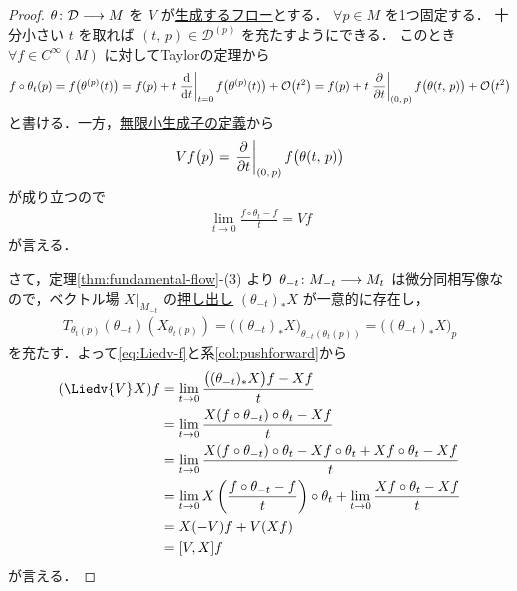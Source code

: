 \documentclass[TQFT_main]{subfiles}
\begin{document}
\begin{proof}
    $\theta \colon \mathcal{D} \longrightarrow M$ を $V$ が\hyperref[thm:fundamental-flow]{生成するフロー}とする．
    $\forall p \in M$ を1つ固定する．
    十分小さい $t$ を取れば $(t,\, p) \in \mathcal{D}^{(p)}$ を充たすようにできる．
    このとき $\forall f \in C^\infty (M)$ に対してTaylorの定理から
    \begin{align}
        f \circ \theta_t (p) = f \bigl( \theta^{(p)}(t) \bigr) = f(p) + t \eval{\dv{}{t}}_{t=0} f \bigl( \theta^{(p)}(t) \bigr) + \order{t^2} = f(p) + t \eval{\pdv{}{t}}_{(0,\, p)} f \bigl( \theta(t,\, p) \bigr) + \order{t^2}
    \end{align}
    と書ける．一方，\hyperref[prop:infinitesimal-generator-local]{無限小生成子の定義}から
    \begin{align}
        Vf \bigl( p \bigr) = \eval{\pdv{}{t}}_{(0,\, p)} f \bigl( \theta(t,\, p) \bigr) 
    \end{align}
    が成り立つので
    \begin{align}
        \label{eq:Liedv-f}
        \lim_{t\to 0} \frac{f \circ \theta_t - f}{t} = Vf
    \end{align}
    が言える．
    
    さて，定理\ref{thm:fundamental-flow}-(3) より $\theta_{-t} \colon M_{-t} \longrightarrow M_t$ は微分同相写像なので，ベクトル場 $X|_{M_{-t}}$ の\hyperref[prop:diffeo-Frelated]{押し出し} $(\theta_{-t})_* X$ が一意的に存在し，
    \begin{align}
        T_{\theta_t(p)} (\theta_{-t})(X_{\theta_t (p)}) = \bigl((\theta_{-t})_* X\bigr)_{\theta_{-t} (\theta_t(p))} = \bigl((\theta_{-t})_* X\bigr)_{p}
    \end{align}
    を充たす．よって\eqref{eq:Liedv-f}と系\ref{col:pushforward}から
    \begin{align}
        (\Liedv{V} X) f
        &= \lim_{t\to 0} \frac{\bigl((\theta_{-t})_* X\bigr)f - Xf}{t} \\
        &= \lim_{t\to 0} \frac{X (f \circ \theta_{-t}) \circ \theta_t - Xf}{t} \\
        &= \lim_{t\to 0} \frac{X (f \circ \theta_{-t}) \circ \theta_t - Xf \circ \theta_t + Xf \circ \theta_t - Xf}{t} \\
        &= \lim_{t\to 0} X\left(\frac{f \circ \theta_{-t} - f}{t}\right) \circ \theta_{t}+ \lim_{t \to 0} \frac{Xf \circ \theta_t - Xf}{t} \\
        &= X (-V) f + V(Xf) \\
        &= \comm{V}{X}f
    \end{align}
    が言える．
\end{proof}
\end{document}
